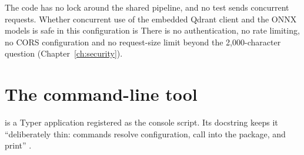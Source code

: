 The code has no lock around the shared pipeline, and no test sends concurrent requests. Whether concurrent use of the embedded Qdrant client and the ONNX models is safe in this configuration is \NotDet{} There is no authentication, no rate limiting, no CORS configuration and no request-size limit beyond the 2,000-character question (Chapter~\ref{ch:security}).

\section{The command-line tool}
\label{sec:cli}

 is a Typer application registered as the  console script. Its docstring keeps it \enquote{deliberately thin: commands resolve configuration, call into the package, and print} .


